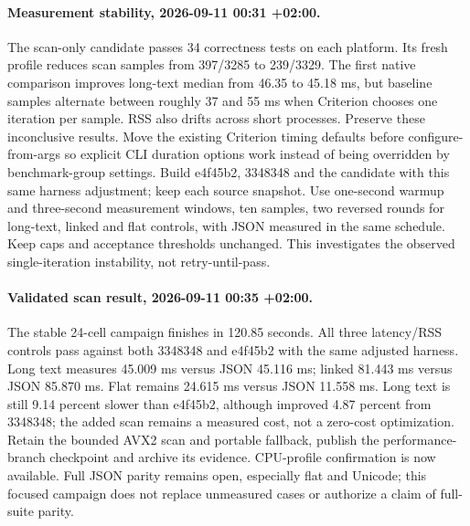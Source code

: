 \documentclass[11pt,a4paper]{article}
\begin{document}
\paragraph{Measurement stability, 2026-09-11 00:31 +02:00.}
The scan-only candidate passes 34 correctness tests on each platform. Its fresh
profile reduces scan samples from 397/3285 to 239/3329. The first native comparison
improves long-text median from 46.35 to 45.18 ms, but baseline samples alternate
between roughly 37 and 55 ms when Criterion chooses one iteration per sample.
RSS also drifts across short processes. Preserve these inconclusive results.
Move the existing Criterion timing defaults before configure-from-args so explicit
CLI duration options work instead of being overridden by benchmark-group settings.
Build e4f45b2, 3348348 and the candidate with this same harness adjustment; keep
each source snapshot. Use one-second warmup and three-second measurement windows,
ten samples, two reversed rounds for long-text, linked and flat controls, with
JSON measured in the same schedule. Keep caps and acceptance thresholds unchanged.
This investigates the observed single-iteration instability, not retry-until-pass.

\paragraph{Validated scan result, 2026-09-11 00:35 +02:00.}
The stable 24-cell campaign finishes in 120.85 seconds. All three latency/RSS
controls pass against both 3348348 and e4f45b2 with the same adjusted harness.
Long text measures 45.009 ms versus JSON 45.116 ms; linked 81.443 ms versus JSON
85.870 ms. Flat remains 24.615 ms versus JSON 11.558 ms. Long text is still
9.14 percent slower than e4f45b2, although improved 4.87 percent from 3348348;
the added scan remains a measured cost, not a zero-cost optimization.
Retain the bounded AVX2 scan and portable fallback, publish the performance-branch
checkpoint and archive its evidence. CPU-profile confirmation is now available.
Full JSON parity remains open, especially flat and Unicode; this focused campaign
does not replace unmeasured cases or authorize a claim of full-suite parity.
\end{document}
